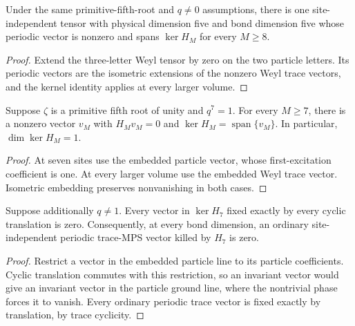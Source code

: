 \begin{lemma}
    \label{lem:seven_sector_eventual_fixed_tensor}
    \leanok
    Under the same primitive-fifth-root and $q\ne0$ assumptions, there is
    one site-independent tensor with physical dimension five and bond
    dimension five whose periodic vector is nonzero and spans $\ker H_M$
    for every $M\ge8$.
\end{lemma}
\begin{proof}
    \leanok
    Extend the three-letter Weyl tensor by zero on the two particle letters.
    Its periodic vectors are the isometric extensions of the nonzero
    Weyl trace vectors, and the kernel identity applies at every larger volume.
\end{proof}

\begin{lemma}
    \label{lem:seven_sector_permitted_ground_lines}
    \leanok
    Suppose $\zeta$ is a primitive fifth root of unity and $q^7=1$.
    For every $M\ge7$, there is a nonzero vector $v_M$ with
    $H_Mv_M=0$ and $\ker H_M=\operatorname{span}\{v_M\}$.
    In particular, $\dim\ker H_M=1$.
\end{lemma}
\begin{proof}
    \leanok
    At seven sites use the embedded particle vector, whose first-excitation
    coefficient is one. At every larger volume use the embedded Weyl trace
    vector. Isometric embedding preserves nonvanishing in both cases.
\end{proof}

\begin{lemma}
    \label{lem:seven_sector_no_short_trace_ground}
    \leanok
    Suppose additionally $q\ne1$. Every vector in $\ker H_7$ fixed exactly
    by every cyclic translation is zero. Consequently, at every bond
    dimension, an ordinary site-independent periodic trace-MPS vector
    killed by $H_7$ is zero.
\end{lemma}
\begin{proof}
    \leanok
    Restrict a vector in the embedded particle line to its particle
    coefficients. Cyclic translation commutes with this restriction, so an
    invariant vector would give an invariant vector in the particle ground
    line, where the nontrivial phase forces it to vanish. Every ordinary
    periodic trace vector is fixed exactly by translation, by trace cyclicity.
\end{proof}

